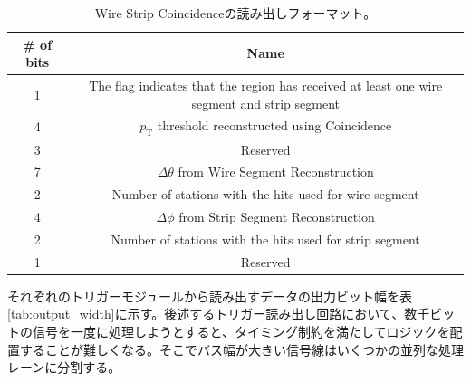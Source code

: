 \begin{table}[]
    \centering
    \caption[Wire Strip Coincidenceの読み出しフォーマット]{Wire Strip Coincidenceの読み出しフォーマット。}
    \label{tab:WS_format}
    \begin{tabular}{|c|c|}
    \hline
    \# of bits & Name                                                                                        \\ \hline\hline
    1          & The flag indicates that the region has received at least one wire segment and strip segment \\ \hline
    4          & $p_{\mathrm{T}}$ threshold reconstructed using Coincidence                                  \\ \hline
    3          & Reserved                                                                                    \\ \hline
    7          & $\Delta\theta$ from Wire Segment Reconstruction                                             \\ \hline
    2          & Number of stations with the hits used for wire segment                                      \\ \hline
    4          & $\Delta\phi$ from Strip Segment Reconstruction                                              \\ \hline
    2          & Number of stations with the hits used for strip segment                                     \\ \hline
    1          & Reserved                                                                                    \\ \hline
    \end{tabular}
\end{table}


それぞれのトリガーモジュールから読み出すデータの出力ビット幅を表\ref{tab:output_width}に示す。後述するトリガー読み出し回路において、数千ビットの信号を一度に処理しようとすると、タイミング制約を満たしてロジックを配置することが難しくなる。そこでバス幅が大きい信号線はいくつかの並列な処理レーンに分割する。

